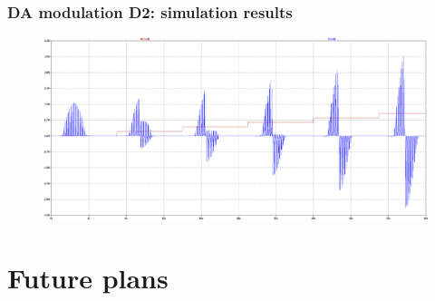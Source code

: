 \documentclass[12pt, aspectratio=169]{beamer}
\begin{document}

\begin{frame}
\frametitle{DA modulation D2: simulation results}
\begin{figure}
\includegraphics[width=0.8\linewidth]{resultD2v3.png}
\end{figure}
\end{frame}

\section{Future plans}
\end{document}

